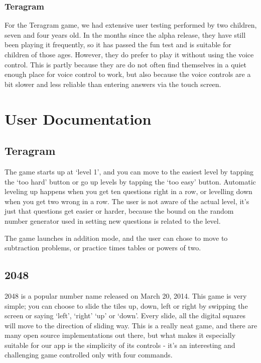 \documentclass[11pt, oneside]{article}
\begin{document}
\subsubsection*{Teragram}

For the Teragram game, we had extensive user testing performed by two
children, seven and four years old. In the months since the alpha
release, they have still been playing it frequently, so it has passed
the fun test and is suitable for children of those ages. However, they
do prefer to play it without using the voice control. This is partly
because they are do not often find themselves in a quiet enough place
for voice control to work, but also because the voice controls are a
bit slower and less reliable than entering answers via the touch
screen.

\pagebreak

\section{User Documentation}

\subsection{Teragram}
The game starts up at `level 1', and you can move to the easiest level
by tapping the `too hard' button or go up levels by tapping the `too
easy' button. Automatic leveling up happens when you get ten questions
right in a row, or levelling down when you get two wrong in a row. The
user is not aware of the actual level, it's just that questions get
easier or harder, because the bound on the random number generator
used in setting new questions is related to the level.

The game launches in addition mode, and the user can chose to move to
subtraction problems, or practice times tables or powers of two.

\subsection{2048}
2048 is a popular number name released on March 20, 2014. This game is
very simple; you can choose to slide the tiles up, down, left or right
by swipping the screen or saying `left', `right' `up' or `down'. Every
slide, all the digital squares will move to the direction of sliding
way. This is a really neat game, and there are many open source
implementations out there, but what makes it especially suitable for
our app is the simplicity of its controls - it's an interesting and
challenging game controlled only with four commands.
\end{document}
